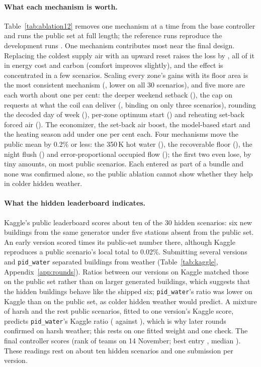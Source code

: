 \documentclass{article}
\begin{document}
\paragraph{What each mechanism is worth.} Table~\ref{tab:ablation12} removes one mechanism at a time from the base controller and runs the public set at full length; the reference runs reproduce the development runs \RElvAbRefMatch. One mechanism contributes most near the final design. Replacing the coldest supply air with an upward reset raises the loss by \RElvAbSatRel, all of it in energy cost and carbon (comfort improves slightly), and the effect is concentrated in a few scenarios. Scaling every zone's gains with its floor area is the most consistent mechanism (\RElvAbNoareaRel, lower on all 30 scenarios), and five more are each worth about one per cent: the deeper weekend setback (\RElvAbNoweekendRel), the cap on requests at what the coil can deliver (\RElvAbNowcapRel, binding on only three scenarios), rounding the decoded day of week (\RElvAbNodowRel), per-zone optimum start (\RElvAbNozoneRel) and reheating set-back forced air (\RElvAbNoneutralRel). The economizer, the set-back air boost, the model-based start and the heating season add under one per cent each. Four mechanisms move the public mean by 0.2\% or less: the 350\,K hot water (\RElvAbTwRel), the recoverable floor (\RElvAbNofloorRel), the night flush (\RElvAbNoflushRel) and error-proportional occupied flow (\RElvAbNooccdynRel); the first two even lose, by tiny amounts, on most public scenarios. Each entered as part of a bundle and none was confirmed alone, so the public ablation cannot show whether they help in colder hidden weather.



\paragraph{What the hidden leaderboard indicates.} Kaggle's public leaderboard scores about ten of the 30 hidden scenarios: six new buildings from the same generator under five stations absent from the public set. An early version scored \RFiveKagGapPub{} times its public-set number there, although Kaggle reproduces a public scenario's local total to 0.02\%. Submitting several versions and \texttt{pid\_water} separated buildings from weather (Table~\ref{tab:kaggle}, Appendix~\ref{app:rounds}). Ratios between our versions on Kaggle matched those on the public set rather than on larger generated buildings, which suggests that the hidden buildings behave like the shipped six; \texttt{pid\_water}'s ratio was lower on Kaggle than on the public set, as colder hidden weather would predict. A mixture of \RSixMixWPct{} harsh and the rest public scenarios, fitted to one version's Kaggle score, predicts \texttt{pid\_water}'s Kaggle ratio (\RSixMixPid{} against \RSixKagRatioPid), which is why later rounds confirmed on harsh weather; this rests on one fitted weight and one check. The final controller scores \RFtKagVFourteen{} (rank \FinKagRank{} of \FinKagTeams{} teams on 14 November; best entry \FinKagBest, median \FinKagMedian). These readings rest on about ten hidden scenarios and one submission per version.
\end{document}

